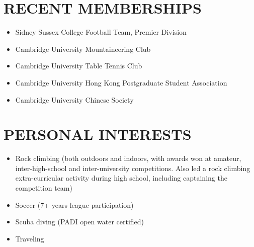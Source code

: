 \documentclass[a4paper,10pt]{extarticle}
\begin{document}




\section*{RECENT MEMBERSHIPS}
\begin{itemize}
    \item Sidney Sussex College Football Team, Premier Division

    \item Cambridge University Mountaineering Club

    \item Cambridge University Table Tennis Club

    \item Cambridge University Hong Kong Postgraduate Student Association

    \item Cambridge University Chinese Society
\end{itemize}

\section*{PERSONAL INTERESTS}
\begin{itemize}
    \item Rock climbing (both outdoors and indoors, with awards won at amateur, inter-high-school and inter-university competitions. Also led a rock climbing extra-curricular activity during high school, including captaining the competition team)

    \item Soccer (7+ years league participation)

    \item Scuba diving (PADI open water certified)

    \item Traveling
\end{itemize}







\end{document}
